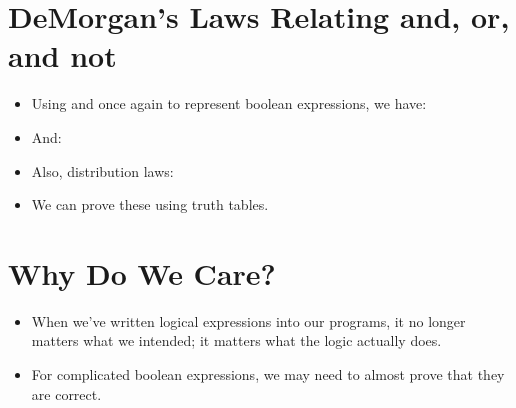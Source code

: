 \documentclass[letterpaper,10pt,english]{sphinxmanual}
\begin{document}
\section{DeMorgan’s Laws Relating and, or, and not}
\label{\detokenize{lecture_notes/lec11_conditionals2:demorgans-laws-relating-and-or-and-not}}\begin{itemize}
\item {} 
Using  and  once again to represent boolean
expressions, we have:

\begin{sphinxVerbatim}[commandchars=\\\{\}]
         
\end{sphinxVerbatim}

\item {} 
And:

\begin{sphinxVerbatim}[commandchars=\\\{\}]
         
\end{sphinxVerbatim}

\item {} 
Also, distribution laws:

\begin{sphinxVerbatim}[commandchars=\\\{\}]
            
            
\end{sphinxVerbatim}

\item {} 
We can prove these using truth tables.

\end{itemize}


\section{Why Do We Care?}
\label{\detokenize{lecture_notes/lec11_conditionals2:why-do-we-care}}\begin{itemize}
\item {} 
When we’ve written logical expressions into our programs, it no
longer matters what we intended; it matters what the logic actually
does.

\item {} 
For complicated boolean expressions, we may need to almost prove that
they are correct.

\end{itemize}
\end{document}
